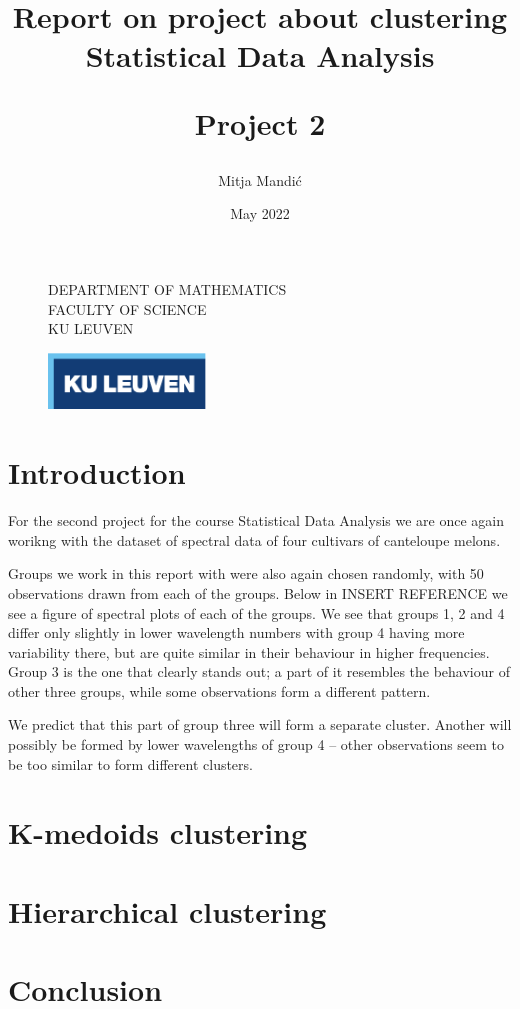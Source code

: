 \documentclass[12pt]{article}
\title{\vspace*{40.0mm}
  \bf Report on project about clustering
         \vspace*{20.0mm} \\
  \Large\bf Statistical Data Analysis 
  
 
  
  Project 2 \vspace*{20.0mm}
  \vspace*{40.0mm}}
\author{Mitja Mandić}
\date{ May 2022}
\makeatletter
\def\cleardoublepage{\clearpage\if@twoside \ifodd\c@page\else%
\hbox{}%
\thispagestyle{empty}%
\clearpage%
\if@twocolumn\hbox{}\clearpage\fi\fi\fi}
\makeatother
\begin{document}
\begin{figure}
  \parbox[t]{125mm}{
    \vspace*{6mm}
    \scriptsize\sf           DEPARTMENT OF MATHEMATICS \\
    \scriptsize\sf           FACULTY OF SCIENCE\\
    \scriptsize\sf           KU LEUVEN}
  \parbox[t]{40mm}{
    \begin{flushright}
      \includegraphics[height=15mm]{../images/logo.eps.pdf}
    \end{flushright}}
\end{figure}

\maketitle
\thispagestyle{empty}
\raggedbottom

\cleardoublepage
{}
\setcounter{tocdepth}{2}
{}

\section{Introduction}
For the second project for the course Statistical Data Analysis we are once again worikng with the
dataset of spectral data of four cultivars of canteloupe melons. 

Groups we work in this report with were also again chosen randomly, with 50 observations drawn from each of the groups. Below in INSERT REFERENCE we see a figure of 
spectral plots of each of the groups. We see that groups 1, 2 and 4 differ only slightly in lower wavelength numbers with group 4 having more variability there,
but are quite similar in their behaviour in higher frequencies. Group 3 is the one that clearly stands out; 
a part of it resembles the behaviour of other three groups, while some observations form a different pattern. 

We predict that this part of group three will form a 
separate cluster. Another will possibly be formed by lower wavelengths of group 4 -- other observations seem to be too similar to form different clusters.

\section{K-medoids clustering}

\section{Hierarchical clustering}

\section{Conclusion}
\end{document}
